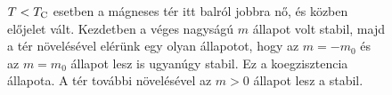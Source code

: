    \begin{figure}[ht!]
    \centering
     \hspace{6pt}
     \hspace{6pt}
    \caption{
     $T<T_\text{C}$ esetben a mágneses tér itt balról jobbra nő, és közben előjelet vált. Kezdetben a véges nagyságú $m$ állapot volt stabil, majd a tér növelésével elérünk egy olyan állapotot, hogy az $m=-m_0$ és az $m=m_0$ állapot lesz is ugyanúgy stabil. Ez a koegzisztencia állapota. A tér további növelésével az $m>0$ állapot lesz a stabil. 
    }\label{fig:B09-elsorend}
   \end{figure}
   
